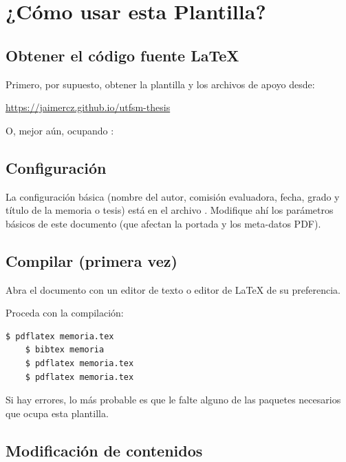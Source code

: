 
\chapter{¿Cómo usar esta Plantilla?}

\section{Obtener el código fuente \LaTeX}

Primero, por supuesto, obtener la plantilla y los archivos de apoyo desde:

\url{https://jaimercz.github.io/utfsm-thesis}

O, mejor aún, ocupando :


\section{Configuración}

La configuración básica (nombre del autor, comisión evaluadora, fecha, grado y título de la memoria o tesis) está en el archivo . Modifique ahí los parámetros básicos de este documento (que afectan la portada y los meta-datos PDF).

\section{Compilar (primera vez)}

Abra el documento  con un editor de texto o editor de \LaTeX{} de su preferencia.

Proceda con la compilación:

\begin{Verbatim}[frame=lines, label=Consola (Shell) o Línea de comandos
, fontsize=\footnotesize
, baselinestretch=1
, formatcom=\color{gray}]
    $ pdflatex memoria.tex
    $ bibtex memoria
    $ pdflatex memoria.tex
    $ pdflatex memoria.tex
\end{Verbatim}

Si hay errores, lo más probable es que le falte alguno de las paquetes necesarios que ocupa esta plantilla.

\section{Modificación de contenidos}


